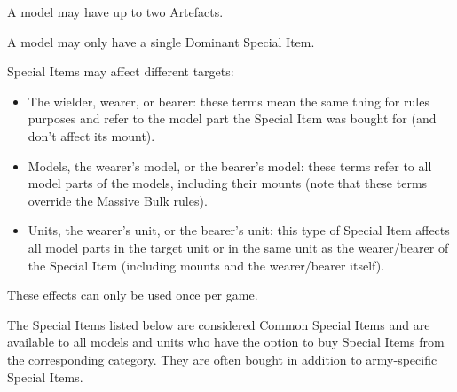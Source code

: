 
A model may have up to two Artefacts.

\newpage
{}


A model may only have a single Dominant Special Item.


Special Items may affect different targets:

\begin{itemize}
\item The wielder, wearer, or bearer: these terms mean the same thing for rules purposes and refer to the model part the Special Item was bought for (and don't affect its mount).
\item Models, the wearer's model, or the bearer's model: these terms refer to all model parts of the models, including their mounts (note that these terms override the Massive Bulk rules).
\item Units, the wearer's unit, or the bearer's unit: this type of Special Item affects all model parts in the target unit or in the same unit as the wearer/bearer of the Special Item (including mounts and the wearer/bearer itself).
\end{itemize}


These effects can only be used once per game.


The Special Items listed below are considered Common Special Items and are available to all models and units who have the option to buy Special Items from the corresponding category. They are often bought in addition to army-specific Special Items.

\hypertarget{weapon_enchantments}{}
\label{weapon_enchantments}

